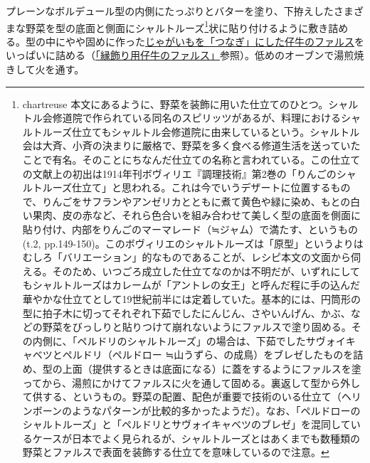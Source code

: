 \begin{recette}
\begin{frsubenv}
\end{frsubenv}


プレーンなボルデュール型の内側にたっぷりとバターを塗り、下拵えしたさまざまな野菜を型の底面と側面にシャルトルーズ\footnote{chartreuse
  本文にあるように、野菜を装飾に用いた仕立てのひとつ。シャルトル会修道院で作られている同名のスピリッツがあるが、料理におけるシャルトルーズ仕立てもシャルトル会修道院に由来しているという。シャルトル会は大斉、小斉の決まりに厳格で、野菜を多く食べる修道生活を送っていたことで有名。そのことにちなんだ仕立ての名称と言われている。この仕立ての文献上の初出は1914年刊ボヴィリエ『調理技術』第2巻の「りんごのシャルトルーズ仕立て」と思われる。これは今でいうデザートに位置するもので、りんごをサフランやアンゼリカとともに煮て黄色や緑に染め、もとの白い果肉、皮の赤など、それら色合いを組み合わせて美しく型の底面を側面に貼り付け、内部をりんごのマーマレード（≒ジャム）で満たす、というもの(t.2,
  pp.149-150)。このボヴィリエのシャルトルーズは「原型」というよりはむしろ「バリエーション」的なものであることが、レシピ本文の文面から伺える。そのため、いつごろ成立した仕立てなのかは不明だが、いずれにしてもシャルトルーズはカレームが「アントレの女王」と呼んだ程に手の込んだ華やかな仕立てとして19世紀前半には定着していた。基本的には、円筒形の型に拍子木に切ってそれぞれ下茹でしたにんじん、さやいんげん、かぶ、などの野菜をびっしりと貼りつけて崩れないようにファルスで塗り固める。その内側に、「ペルドリのシャルトルーズ」の場合は、下茹でしたサヴォイキャベツとペルドリ（ペルドロー
  ≒山うずら、の成鳥）をブレゼしたものを詰め、型の上面（提供するときは底面になる）に蓋をするようにファルスを塗ってから、湯煎にかけてファルスに火を通して固める。裏返して型から外して供する、というもの。野菜の配置、配色が重要で技術のいる仕立て（ヘリンボーンのようなパターンが比較的多かったようだ）。なお、「ペルドローのシャルトルーズ」と「ペルドリとサヴォイキャベツのブレゼ」を混同しているケースが日本でよく見られるが、シャルトルーズとはあくまでも数種類の野菜とファルスで表面を装飾する仕立てを意味しているので注意。}状に貼り付けるように敷き詰める。型の中にやや固めに作った\protect\hyperlink{farce-de-veau-pour-bordures}{じゃがいもを「つなぎ」にした仔牛のファルス}をいっぱいに詰める（\protect\hyperlink{farce-de-veau-pour-bordures}{「縁飾り用仔牛のファルス」}参照）。低めのオーブンで湯煎焼きして火を通す。


\end{recette}
